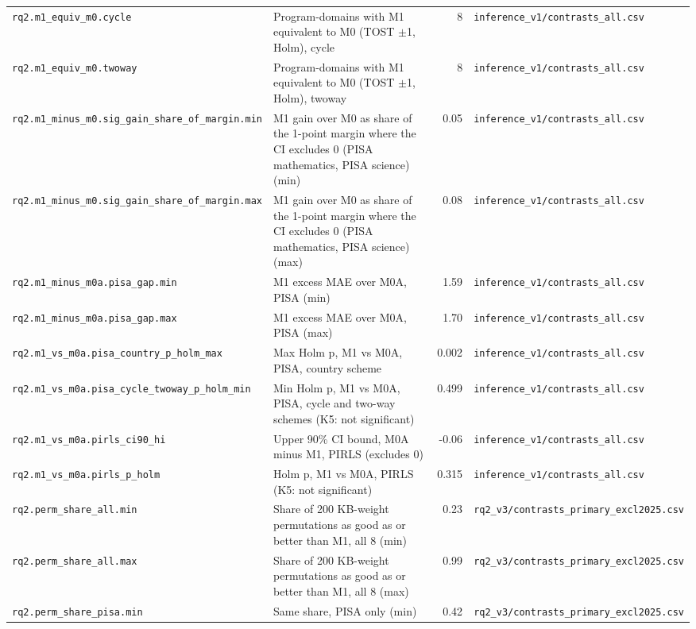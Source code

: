 {\begin{longtable}{p{4.6cm}p{5.6cm}rp{3.6cm}}
\texttt{rq2.m1\_equiv\_m0.cycle} & Program-domains with M1 equivalent to M0 (TOST $\pm$1, Holm), cycle & 8 & \texttt{inference\_v1/contrasts\_all.csv} \\
\texttt{rq2.m1\_equiv\_m0.twoway} & Program-domains with M1 equivalent to M0 (TOST $\pm$1, Holm), twoway & 8 & \texttt{inference\_v1/contrasts\_all.csv} \\
\texttt{rq2.m1\_minus\_m0.sig\_gain\_share\_of\_margin.min} & M1 gain over M0 as share of the 1-point margin where the CI excludes 0 (PISA mathematics, PISA science) (min) & 0.05 & \texttt{inference\_v1/contrasts\_all.csv} \\
\texttt{rq2.m1\_minus\_m0.sig\_gain\_share\_of\_margin.max} & M1 gain over M0 as share of the 1-point margin where the CI excludes 0 (PISA mathematics, PISA science) (max) & 0.08 & \texttt{inference\_v1/contrasts\_all.csv} \\
\texttt{rq2.m1\_minus\_m0a.pisa\_gap.min} & M1 excess MAE over M0A, PISA (min) & 1.59 & \texttt{inference\_v1/contrasts\_all.csv} \\
\texttt{rq2.m1\_minus\_m0a.pisa\_gap.max} & M1 excess MAE over M0A, PISA (max) & 1.70 & \texttt{inference\_v1/contrasts\_all.csv} \\
\texttt{rq2.m1\_vs\_m0a.pisa\_country\_p\_holm\_max} & Max Holm p, M1 vs M0A, PISA, country scheme & 0.002 & \texttt{inference\_v1/contrasts\_all.csv} \\
\texttt{rq2.m1\_vs\_m0a.pisa\_cycle\_twoway\_p\_holm\_min} & Min Holm p, M1 vs M0A, PISA, cycle and two-way schemes (K5: not significant) & 0.499 & \texttt{inference\_v1/contrasts\_all.csv} \\
\texttt{rq2.m1\_vs\_m0a.pirls\_ci90\_hi} & Upper 90\% CI bound, M0A minus M1, PIRLS (excludes 0) & -0.06 & \texttt{inference\_v1/contrasts\_all.csv} \\
\texttt{rq2.m1\_vs\_m0a.pirls\_p\_holm} & Holm p, M1 vs M0A, PIRLS (K5: not significant) & 0.315 & \texttt{inference\_v1/contrasts\_all.csv} \\
\texttt{rq2.perm\_share\_all.min} & Share of 200 KB-weight permutations as good as or better than M1, all 8 (min) & 0.23 & \texttt{rq2\_v3/contrasts\_primary\_excl2025.csv} \\
\texttt{rq2.perm\_share\_all.max} & Share of 200 KB-weight permutations as good as or better than M1, all 8 (max) & 0.99 & \texttt{rq2\_v3/contrasts\_primary\_excl2025.csv} \\
\texttt{rq2.perm\_share\_pisa.min} & Same share, PISA only (min) & 0.42 & \texttt{rq2\_v3/contrasts\_primary\_excl2025.csv} \\

\end{longtable}}
